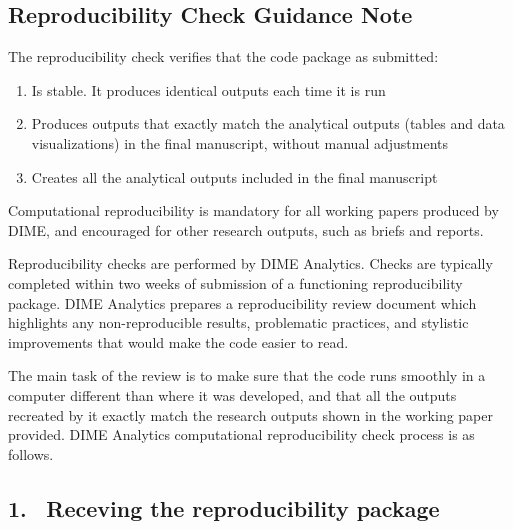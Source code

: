 


	\begin{fullwidth}


	\section*{Reproducibility Check Guidance Note}

The reproducibility check verifies that the code package as submitted:

	\begin{enumerate}
		\setlength\itemsep{-0.1em}
		\item Is stable. It produces identical outputs each time it is run
		\item Produces outputs that exactly match the analytical outputs (tables and data visualizations) in the final manuscript, without manual adjustments
		\item Creates all the analytical outputs included in the final manuscript
	\end{enumerate}

Computational reproducibility is mandatory for all working papers produced by DIME, and encouraged for other research outputs, such as briefs and reports. 


	\bigskip

Reproducibility checks are performed by DIME Analytics. Checks are typically completed within two weeks of submission of a functioning reproducibility package. DIME Analytics prepares a reproducibility review document which highlights any non-reproducible results, problematic practices, and stylistic improvements that would make the code easier to read.

	The main task of the review is to make sure that the code runs smoothly in a computer different than where it was developed, and that all the outputs recreated by it exactly match the research outputs shown in the working paper provided.	
DIME Analytics computational reproducibility check process is as follows.

	\subsection{1. \, Receving the reproducibility package}


\end{fullwidth}
